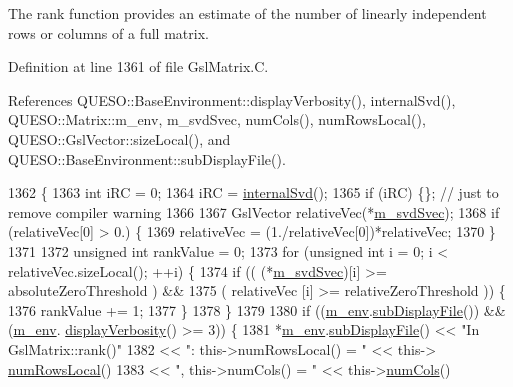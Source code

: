The rank function provides an estimate of the number of linearly independent rows or columns of a full matrix. 

Definition at line 1361 of file Gsl\-Matrix.\-C.



References Q\-U\-E\-S\-O\-::\-Base\-Environment\-::display\-Verbosity(), internal\-Svd(), Q\-U\-E\-S\-O\-::\-Matrix\-::m\-\_\-env, m\-\_\-svd\-Svec, num\-Cols(), num\-Rows\-Local(), Q\-U\-E\-S\-O\-::\-Gsl\-Vector\-::size\-Local(), and Q\-U\-E\-S\-O\-::\-Base\-Environment\-::sub\-Display\-File().


\begin{DoxyCode}
1362 \{
1363   \textcolor{keywordtype}{int} iRC = 0;
1364   iRC = \hyperlink{class_q_u_e_s_o_1_1_gsl_matrix_a971c0fcee50b741419f4f2322329647f}{internalSvd}();
1365   \textcolor{keywordflow}{if} (iRC) \{\}; \textcolor{comment}{// just to remove compiler warning}
1366 
1367   GslVector relativeVec(*\hyperlink{class_q_u_e_s_o_1_1_gsl_matrix_a9c2d46159d01da442aba68fbeecb2dfc}{m\_svdSvec});
1368   \textcolor{keywordflow}{if} (relativeVec[0] > 0.) \{
1369     relativeVec = (1./relativeVec[0])*relativeVec;
1370   \}
1371 
1372   \textcolor{keywordtype}{unsigned} \textcolor{keywordtype}{int} rankValue = 0;
1373   \textcolor{keywordflow}{for} (\textcolor{keywordtype}{unsigned} \textcolor{keywordtype}{int} i = 0; i < relativeVec.sizeLocal(); ++i) \{
1374     \textcolor{keywordflow}{if} (( (*\hyperlink{class_q_u_e_s_o_1_1_gsl_matrix_a9c2d46159d01da442aba68fbeecb2dfc}{m\_svdSvec})[i] >= absoluteZeroThreshold ) &&
1375         ( relativeVec [i] >= relativeZeroThreshold )) \{
1376        rankValue += 1;
1377     \}
1378   \}
1379 
1380   \textcolor{keywordflow}{if} ((\hyperlink{class_q_u_e_s_o_1_1_matrix_a247fb0fc0b87fecdee054bb4660b68e8}{m\_env}.\hyperlink{class_q_u_e_s_o_1_1_base_environment_a8a0064746ae8dddfece4229b9ad374d6}{subDisplayFile}()) && (\hyperlink{class_q_u_e_s_o_1_1_matrix_a247fb0fc0b87fecdee054bb4660b68e8}{m\_env}.
      \hyperlink{class_q_u_e_s_o_1_1_base_environment_a1fe5f244fc0316a0ab3e37463f108b96}{displayVerbosity}() >= 3)) \{
1381     *\hyperlink{class_q_u_e_s_o_1_1_matrix_a247fb0fc0b87fecdee054bb4660b68e8}{m\_env}.\hyperlink{class_q_u_e_s_o_1_1_base_environment_a8a0064746ae8dddfece4229b9ad374d6}{subDisplayFile}() << \textcolor{stringliteral}{"In GslMatrix::rank()"}
1382                             << \textcolor{stringliteral}{": this->numRowsLocal() = "}  << this->
      \hyperlink{class_q_u_e_s_o_1_1_gsl_matrix_ab5ec937a9fd439eef1a87e12c0dbccb4}{numRowsLocal}()
1383                             << \textcolor{stringliteral}{", this->numCols() = "}       << this->\hyperlink{class_q_u_e_s_o_1_1_gsl_matrix_ad5005f168fe030468e834776afb1859b}{numCols}()

\end{DoxyCode}
